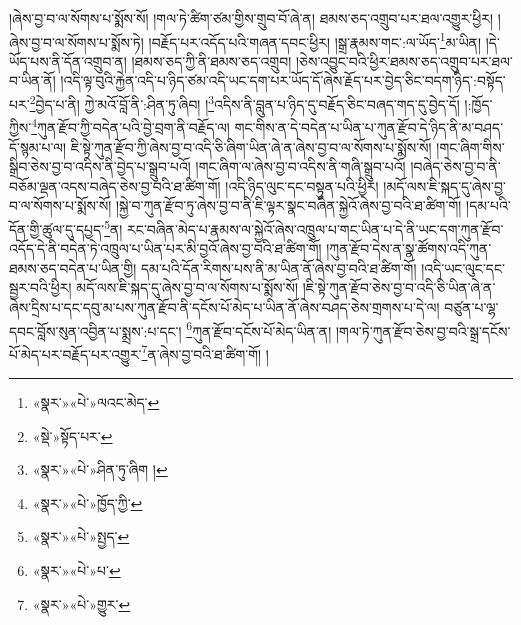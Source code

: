 །ཞེས་བྱ་བ་ལ་སོགས་པ་སྨོས་སོ། །གལ་ཏེ་ཚིག་ཙམ་གྱིས་གྲུབ་བོ་ཞེ་ན། ཐམས་ཅད་འགྲུབ་པར་ཐལ་འགྱུར་ཕྱིར། །ཞེས་བྱ་བ་ལ་སོགས་པ་སྨོས་ཏེ། །བརྗོད་པར་འདོད་པའི་གཞན་དབང་ཕྱིར། །སྒྲ་རྣམས་གང་:ལ་ཡོད་\footnote{«སྣར་»«པེ་»ལའང་མེད་}མ་ཡིན། །དེ་ཡོད་པས་ནི་དོན་འགྲུབ་ན། །ཐམས་ཅད་ཀྱི་ནི་ཐམས་ཅད་འགྲུབ། །ཅེས་འབྱུང་བའི་ཕྱིར་ཐམས་ཅད་འགྲུབ་པར་ཐལ་བ་ཡིན་ནོ། །འདི་ལྟ་བུའི་རྐྱེན་འདི་པ་ཉིད་ཙམ་འདི་ཡང་དག་པར་ཡོད་དོ་ཞེས་རྗོད་པར་བྱེད་ཅིང་བདག་ཉིད་:བསྟོད་པར་\footnote{«སྡེ་»སྟོད་པར་}བྱེད་པ་ནི། ཀྱེ་མའོ་བློ་ནི་:ཤིན་ཏུ་ཞིབ། །\footnote{«སྣར་»«པེ་»ཤིན་ཏུ་ཞིག །}འདིས་ནི་བླུན་པ་ཉིད་དུ་བརྗོད་ཅིང་བཞད་གད་དུ་བྱེད་དོ། །:ཁྱོད་ཀྱིས་\footnote{«སྣར་»«པེ་»ཁྱོད་ཀྱི་}ཀུན་རྫོབ་ཀྱི་བདེན་པའི་བྱེ་བྲག་ནི་བརྗོད་ལ། གང་གིས་ན་དེ་བདེན་པ་ཡིན་པ་ཀུན་རྫོབ་དེ་ཉིད་ནི་མ་བཤད་དོ་སྙམ་པ་ལ། ཇི་སྟེ་ཀུན་རྫོབ་ཀྱི་ཞེས་བྱ་བ་འདི་ཅི་ཞིག་ཡིན་ཞེ་ན་ཞེས་བྱ་བ་ལ་སོགས་པ་སྨོས་སོ། །གང་ཞིག་གིས་སྒྲིབ་ཅེས་བྱ་བ་འདིས་ནི་བྱེད་པ་སྒྲུབ་པའོ། །གང་ཞིག་ལ་ཞེས་བྱ་བ་འདིས་ནི་གཞི་སྒྲུབ་པའོ། །བཞེད་ཅེས་བྱ་བ་ནི་བཅོམ་ལྡན་འདས་བཞེད་ཅེས་བྱ་བའི་ཐ་ཚིག་གོ། །འདི་ཉིད་ལུང་དང་བསྟུན་པའི་ཕྱིར། །མདོ་ལས་ཇི་སྐད་དུ་ཞེས་བྱ་བ་ལ་སོགས་པ་སྨོས་སོ། །སྐྱེ་བ་ཀུན་རྫོབ་ཏུ་ཞེས་བྱ་བ་ནི་ཇི་ལྟར་སྣང་བཞིན་སྐྱེའོ་ཞེས་བྱ་བའི་ཐ་ཚིག་གོ། །དམ་པའི་དོན་གྱི་ཚུལ་དུ་དཔྱད་\footnote{«སྣར་»«པེ་»སྤྱད་}ན། རང་བཞིན་མེད་པ་རྣམས་ལ་སྐྱེའོ་ཞེས་འཁྲུལ་པ་གང་ཡིན་པ་དེ་ནི་ཡང་དག་ཀུན་རྫོབ་འདོད་དེ་ནི་བདེན་ཏེ་འཁྲུལ་པ་ཡིན་པར་མི་བྱའོ་ཞེས་བྱ་བའི་ཐ་ཚིག་གོ། །ཀུན་རྫོབ་དེས་ན་སྣ་ཚོགས་འདི་ཀུན་ཐམས་ཅད་བདེན་པ་ཡིན་གྱི། དམ་པའི་དོན་རིགས་པས་ནི་མ་ཡིན་ནོ་ཞེས་བྱ་བའི་ཐ་ཚིག་གོ། །འདི་ཡང་ལུང་དང་སྦྱར་བའི་ཕྱིར། མདོ་ལས་ཇི་སྐད་དུ་ཞེས་བྱ་བ་ལ་སོགས་པ་སྨོས་སོ། །ཇི་སྟེ་ཀུན་རྫོབ་ཅེས་བྱ་བ་འདི་ཅི་ཡིན་ཞེ་ན་ཞེས་དྲིས་པ་དང་དབུ་མ་པས་ཀུན་རྫོབ་ནི་དངོས་པོ་མེད་པ་ཡིན་ནོ་ཞེས་བཤད་ཅེས་གྲགས་པ་དེ་ལ། བཙུན་པ་ལྷ་དབང་བློས་སུན་འབྱིན་པ་སྨྲས་:པ་དང་། \footnote{«སྣར་»«པེ་»པ་}ཀུན་རྫོབ་དངོས་པོ་མེད་ཡིན་ན། །གལ་ཏེ་ཀུན་རྫོབ་ཅེས་བྱ་བའི་སྒྲ་དངོས་པོ་མེད་པར་བརྗོད་པར་འགྱུར་\footnote{«སྣར་»«པེ་»གྱུར་}ན་ཞེས་བྱ་བའི་ཐ་ཚིག་གོ། །
